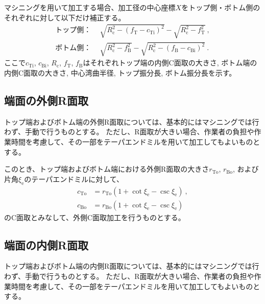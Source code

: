 マシニングを用いて加工する場合、加工径の中心座標$X$をトップ側・ボトム側のそれぞれに対して以下だけ補正する。
\begin{align*}
  \text{トップ側：}&~~
  \sqrt{R_\mathrm c^2-\left(f_\mathrm T-c_\mathrm{Ti}\right)^2}-\sqrt{R_\mathrm c^2-f_\mathrm T^2}\ ,\\
  \text{ボトム側：}&~~
  \sqrt{R_\mathrm c^2-f_\mathrm B^2}-\sqrt{R_\mathrm c^2-\left(f_\mathrm B-c_\mathrm{Bi}\right)^2}\ .
\end{align*}
ここで$c_\mathrm{Ti}$, $c_\mathrm{Bi}$, $R_\mathrm c$, $f_\mathrm T$, $f_\mathrm B$はそれぞれトップ端の内側C面取の大きさ, ボトム端の内側C面取の大きさ, 中心湾曲半径, トップ振分長, ボトム振分長を示す。



\clearpage


\subsection{端面の外側R面取}
トップ端およびボトム端の外側R面取については、基本的にはマシニングでは行わず、手動で行うものとする。
ただし、R面取が大きい場合、作業者の負担や作業時間を考慮して、その一部をテーパエンドミルを用いて加工してもよいものとする。

このとき、トップ端およびボトム端における外側R面取の大きさ$r_\mathrm{To}$, $r_\mathrm{Bo}$, および片角$\xi_\mathrm e$のテーパエンドミルに対して、
\begin{align*}
  c_\mathrm{To} &= r_\mathrm{To}\left(1+\cot\xi_\mathrm e-\csc\xi_\mathrm e\right)\ ,\\
  c_\mathrm{Bo} &= r_\mathrm{Bo}\left(1+\cot\xi_\mathrm e-\csc\xi_\mathrm e\right)
\end{align*}
のC面取とみなして、外側C面取加工を行うものとする。


\subsection{端面の内側R面取}
トップ端およびボトム端の内側R面取については、基本的にはマシニングでは行わず、手動で行うものとする。
ただし、R面取が大きい場合、作業者の負担や作業時間を考慮して、その一部をテーパエンドミルを用いて加工してもよいものとする。

